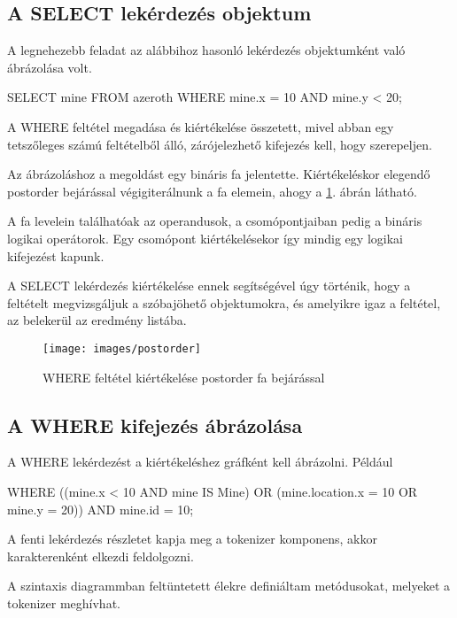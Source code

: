 \subsection{A SELECT lekérdezés objektum}

A legnehezebb feladat az alábbihoz hasonló lekérdezés objektumként való ábrázolása volt.

\begin{sql}
SELECT mine FROM azeroth WHERE mine.x = 10 AND mine.y < 20;
\end{sql}

A WHERE feltétel megadása és kiértékelése összetett, mivel abban egy tetszőleges számú feltételből álló, zárójelezhető kifejezés kell, hogy szerepeljen.

Az ábrázoláshoz a megoldást egy bináris fa jelentette. Kiértékeléskor elegendő postorder bejárással végigiterálnunk a fa elemein, ahogy a \ref{fig:postorder}. ábrán látható.

A fa levelein találhatóak az operandusok, a csomópontjaiban pedig a bináris logikai operátorok. Egy csomópont kiértékelésekor így mindig egy logikai kifejezést kapunk.

A SELECT lekérdezés kiértékelése ennek segítségével úgy történik, hogy a feltételt megvizsgáljuk a szóbajöhető objektumokra, és amelyikre igaz a feltétel, az belekerül az eredmény listába.

\begin{figure}[htb]
	\begin{center}
		\texttt{[image: images/postorder]}
		\caption{WHERE feltétel kiértékelése postorder fa bejárással}
		\label{fig:postorder}
	\end{center}
\end{figure}


\subsection{A WHERE kifejezés ábrázolása}

A WHERE lekérdezést a kiértékeléshez gráfként kell ábrázolni. Például

\begin{sql}
WHERE ((mine.x < 10 AND mine IS Mine)
  OR (mine.location.x = 10 OR mine.y = 20)) AND mine.id = 10;
\end{sql}

A fenti lekérdezés részletet kapja meg a tokenizer komponens, akkor karakterenként elkezdi feldolgozni.

A szintaxis diagrammban feltüntetett élekre definiáltam metódusokat, melyeket a tokenizer meghívhat. 

